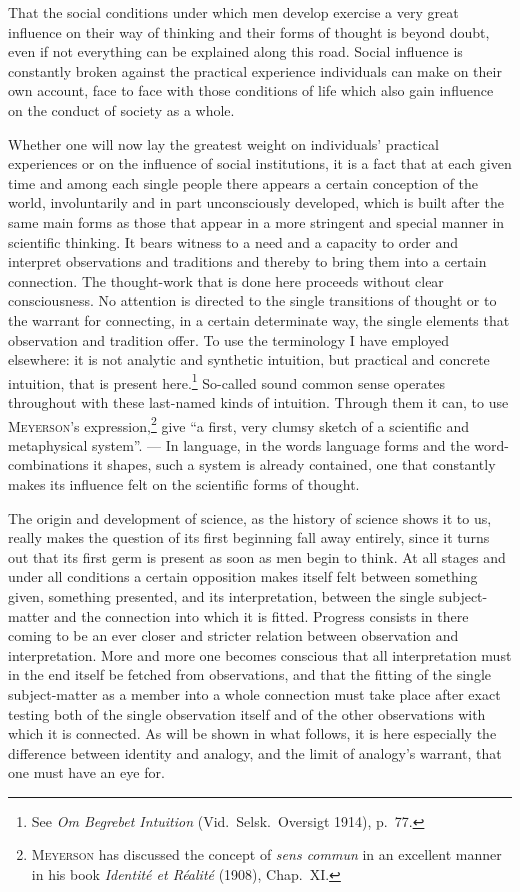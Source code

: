 \documentclass[12pt]{book}
\newcommand{\opage}[1]{\marginnote{\footnotesize\textit{[#1]}}}
\begin{document}
That the social conditions under which men develop exercise a very great
influence on their way of thinking and their forms of thought is beyond doubt,
even if not everything can be explained along this road. Social influence is
constantly broken against the practical experience individuals can make on their
own account, face to face with those conditions of life which also gain
influence on the conduct of society as a whole.

Whether one will now lay the greatest weight on individuals' practical
experiences or on the influence of social institutions, it is a fact that at
each given time and among each single people there appears a certain conception
of the world, involuntarily and in part unconsciously developed, which is built
after the same main forms as those that appear in a more stringent and special
manner in scientific thinking. It bears witness to a need and a capacity to
order and interpret observations and traditions and thereby to bring them into a
certain connection. The thought-work that is done here proceeds without clear
consciousness. No attention is directed to the single transitions of thought or
to the warrant for connecting, in a certain determinate way, the single elements
that observation and tradition offer. To use the terminology I have employed
elsewhere: it is not analytic and synthetic intuition, but practical and
concrete intuition, that is present here.\footnote{See \textit{Om Begrebet
Intuition} (Vid.\ Selsk.\ Oversigt 1914), p.\ 77.} So-called sound common sense
operates throughout with these last-named kinds of intuition. Through them it
can, to use \textsc{Meyerson}'s expression,\footnote{\textsc{Meyerson} has
discussed the concept of \textit{sens commun} in an excellent manner in his book
\textit{Identité et Réalité} (1908), Chap.\ XI.} give ``a first, very clumsy
sketch of a scientific and metaphysical system''. --- In language, in the words
language forms and the word-combinations it shapes, such a system is already
contained, one that constantly makes its influence felt on the scientific forms
of thought.

\opage{6}The origin and development of science, as the history of science shows it to us,
really makes the question of its first beginning fall away entirely, since it
turns out that its first germ is present as soon as men begin to think. At all
stages and under all conditions a certain opposition makes itself felt between
something given, something presented, and its interpretation, between the single
subject-matter and the connection into which it is fitted. Progress consists in there
coming to be an ever closer and stricter relation between observation and
interpretation. More and more one becomes conscious that all interpretation must
in the end itself be fetched from observations, and that the fitting of the
single subject-matter as a member into a whole connection must take place after exact
testing both of the single observation itself and of the other observations with
which it is connected. As will be shown in what follows, it is here especially
the difference between identity and analogy, and the limit of analogy's warrant,
that one must have an eye for.
\end{document}
